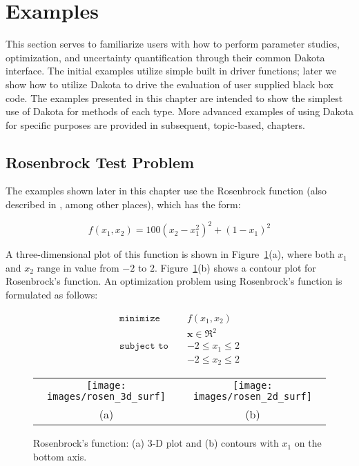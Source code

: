 \section{Examples}\label{tutorial:examples}

This section serves to familiarize users with how to perform parameter 
studies, optimization, and uncertainty quantification through their common
Dakota interface. The initial examples utilize simple built in driver 
functions; later we show how to utilize Dakota to drive the evaluation of 
user supplied black box code. The examples presented in this chapter 
are intended to show the simplest use of Dakota for methods of 
each type. More advanced examples of using Dakota for specific purposes 
are provided in subsequent, topic-based, chapters.

\subsection{Rosenbrock Test Problem}\label{tutorial:examples:rosenbrock}

The examples shown later in this chapter use the Rosenbrock
function \cite{Rosenbrock60} (also described in \cite{Gil81}, among
other places), which has the form:

\begin{equation}
f(x_1,x_2)=100(x_2-x_1^2)^2+(1-x_1)^2 \label{tutorial:rosen}
\end{equation}

A three-dimensional plot of this function is shown in
Figure~\ref{tutorial:rosenbrock_prob}(a), where both $x_1$ and
$x_2$ range in value from $-2$ to $2$.
Figure~\ref{tutorial:rosenbrock_prob}(b) shows a contour plot
for Rosenbrock's function. An optimization problem using Rosenbrock's
function is formulated as follows:

\begin{eqnarray}
\texttt{minimize }   & & f(x_1,x_2)          \nonumber\\
                     & & \mathbf{x} \in \Re^2\nonumber\\
\texttt{subject to } & & -2 \le x_1 \le 2    \\
                     & & -2 \le x_2 \le 2    \nonumber
\end{eqnarray}

\begin{figure}[htp!]
  \centering
  \begin{tabular}{cc}
  \texttt{[image: images/rosen\_3d\_surf]} &
  \texttt{[image: images/rosen\_2d\_surf]} \\
  (a) & (b) \\
  \end{tabular}
  \caption{Rosenbrock's function: (a) 3-D plot and (b) contours with
  $x_1$ on the bottom axis.}
  \label{tutorial:rosenbrock_prob}
\end{figure}


